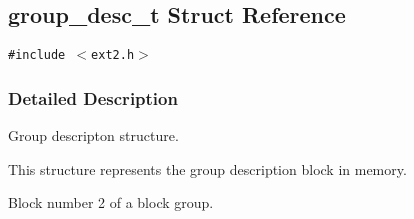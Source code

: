\hypertarget{structgroup__desc__t}{
\subsection{group\_\-desc\_\-t Struct Reference}
\label{structgroup__desc__t}
}
{\tt \#include $<$ext2.h$>$}



\subsubsection{Detailed Description}
Group descripton structure.

This structure represents the group description block in memory.

Block number 2 of a block group. 

